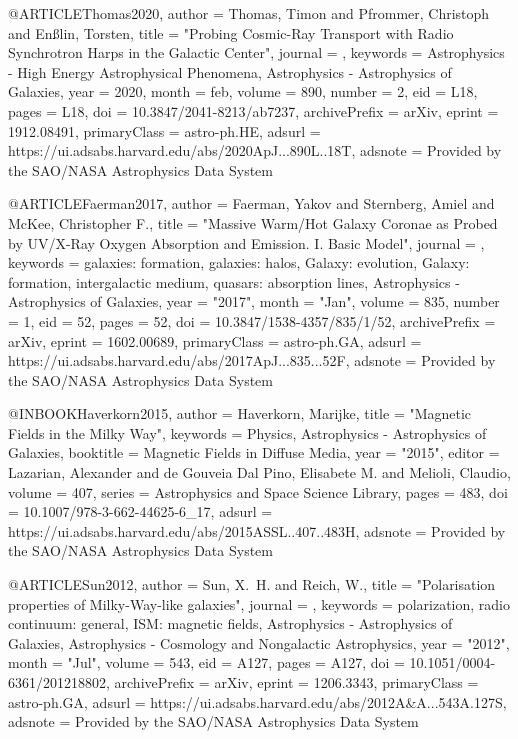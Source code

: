 \documentclass[useAMS,usenatbib]{mnras}
\begin{document}
@ARTICLE{Thomas2020,
       author = {{Thomas}, Timon and {Pfrommer}, Christoph and {En{\ss}lin}, Torsten},
        title = "{Probing Cosmic-Ray Transport with Radio Synchrotron Harps in the Galactic Center}",
      journal = {\apjl},
     keywords = {Astrophysics - High Energy Astrophysical Phenomena, Astrophysics - Astrophysics of Galaxies},
         year = 2020,
        month = feb,
       volume = {890},
       number = {2},
          eid = {L18},
        pages = {L18},
          doi = {10.3847/2041-8213/ab7237},
archivePrefix = {arXiv},
       eprint = {1912.08491},
 primaryClass = {astro-ph.HE},
       adsurl = {https://ui.adsabs.harvard.edu/abs/2020ApJ...890L..18T},
      adsnote = {Provided by the SAO/NASA Astrophysics Data System}
}

@ARTICLE{Faerman2017,
       author = {{Faerman}, Yakov and {Sternberg}, Amiel and {McKee}, Christopher F.},
        title = "{Massive Warm/Hot Galaxy Coronae as Probed by UV/X-Ray Oxygen Absorption and Emission. I. Basic Model}",
      journal = {\apj},
     keywords = {galaxies: formation, galaxies: halos, Galaxy: evolution, Galaxy: formation, intergalactic medium, quasars: absorption lines, Astrophysics - Astrophysics of Galaxies},
         year = "2017",
        month = "Jan",
       volume = {835},
       number = {1},
          eid = {52},
        pages = {52},
          doi = {10.3847/1538-4357/835/1/52},
archivePrefix = {arXiv},
       eprint = {1602.00689},
 primaryClass = {astro-ph.GA},
       adsurl = {https://ui.adsabs.harvard.edu/abs/2017ApJ...835...52F},
      adsnote = {Provided by the SAO/NASA Astrophysics Data System}
}


@INBOOK{Haverkorn2015,
       author = {{Haverkorn}, Marijke},
        title = "{Magnetic Fields in the Milky Way}",
     keywords = {Physics, Astrophysics - Astrophysics of Galaxies},
    booktitle = {Magnetic Fields in Diffuse Media},
         year = "2015",
       editor = {{Lazarian}, Alexander and {de Gouveia Dal Pino}, Elisabete M. and
         {Melioli}, Claudio},
       volume = {407},
       series = {Astrophysics and Space Science Library},
        pages = {483},
          doi = {10.1007/978-3-662-44625-6_17},
       adsurl = {https://ui.adsabs.harvard.edu/abs/2015ASSL..407..483H},
      adsnote = {Provided by the SAO/NASA Astrophysics Data System}
}

@ARTICLE{Sun2012,
       author = {{Sun}, X.~H. and {Reich}, W.},
        title = "{Polarisation properties of Milky-Way-like galaxies}",
      journal = {\aap},
     keywords = {polarization, radio continuum: general, ISM: magnetic fields, Astrophysics - Astrophysics of Galaxies, Astrophysics - Cosmology and Nongalactic Astrophysics},
         year = "2012",
        month = "Jul",
       volume = {543},
          eid = {A127},
        pages = {A127},
          doi = {10.1051/0004-6361/201218802},
archivePrefix = {arXiv},
       eprint = {1206.3343},
 primaryClass = {astro-ph.GA},
       adsurl = {https://ui.adsabs.harvard.edu/abs/2012A&A...543A.127S},
      adsnote = {Provided by the SAO/NASA Astrophysics Data System}
}
\end{document}
